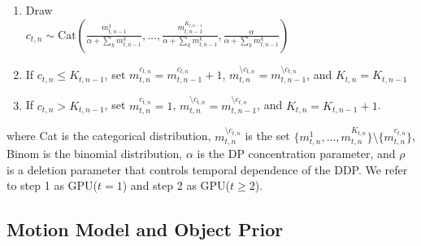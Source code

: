 \documentclass{article}
\begin{document}
\begin{enumerate}
\begin{enumerate}
\begin{enumerate}
            \item Draw \\
                \hbox{}\hspace{-4mm} $c_{t,n} \sim
                \text{Cat} (\frac{m_{t,n-1}^1}{\alpha + \sum_k m_{t,n-1}^k},\ldots,\frac{m_{t,n-1}^{K_{t,n-1}}}{\alpha + \sum_k m_{t,n-1}^k},\frac{\alpha}{\alpha + \sum_k m_{t,n-1}^k})$
            \item If $c_{t,n} \leq K_{t,n-1}$, set 
                $m_{t,n}^{c_{t,n}} = m_{t,n-1}^{c_{t,n}} + 1$, 
                $m_{t,n}^{\setminus c_{t,n}}= m_{t,n-1}^{\setminus c_{t,n}}$, 
                and $K_{t,n} = K_{t,n-1}$
            \item If $c_{t,n} > K_{t,n-1}$, set 
                $m_{t,n}^{c_{t,n}}=1$, 
                $m_{t,n}^{\setminus c_{t,n}} = m_{t,n-1}^{\setminus c_{t,n}}$, 
                and $K_{t,n}=K_{t,n-1}+1$.
        \end{enumerate}
    \end{enumerate}
\end{enumerate}
where Cat is the categorical distribution, $m_{t,n}^{\setminus c_{t,n}}$ is the set 
$\{ m_{t,n}^1,\ldots,m_{t,n}^{K_{t,n}} \} \setminus \{ m_{t,n}^{c_{t,n}} \}$,
Binom is the binomial distribution, $\alpha$ is the DP concentration parameter,
and $\rho$ is a deletion parameter that controls temporal dependence of the DDP. We refer to step 1 as GPU($t=1$) and step 2 as GPU($t\geq2$).

\subsection{Motion Model and Object Prior}
\end{document}
